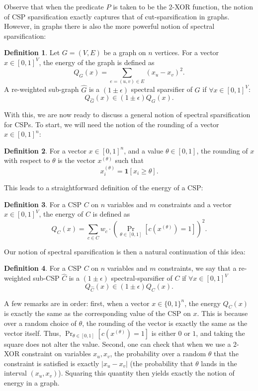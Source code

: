 \documentclass[11pt]{article}
\theoremstyle{definition}
\newtheorem{definition}{Definition}[section]
\newcommand{\zo}{\{0, 1\}}
\newcommand{\eps}{\epsilon}
\begin{document}
Observe that when the predicate $P$ is taken to be the 2-XOR function, the notion of CSP sparsification exactly captures that of cut-sparsification in graphs. However, in graphs there is also the more powerful notion of spectral sparsification:

\begin{definition}
    Let $G = (V, E)$ be a graph on $n$ vertices. For a vector $x \in [0,1]^V$, the energy of the graph is defined as
    \[
    Q_G(x) = \sum_{e = (u,v) \in E} (x_u - x_v)^2.
    \]
    A re-weighted sub-graph $\hat{G}$ is a $(1 \pm \eps)$ spectral sparsifier of $G$ if $\forall x \in [0,1]^V$:
    \[
    Q_{\hat{G}}(x) \in (1 \pm \eps)Q_{G}(x).
    \]
\end{definition}

With this, we are now ready to discuss a general notion of spectral sparsification for CSPs. To start, we will need the notion of the rounding of a vector $x \in [0,1]^n$:

\begin{definition}
    For a vector $x \in [0,1]^n$, and a value $\theta \in [0,1]$, the rounding of $x$ with respect to $\theta$ is the vector $x^{(\theta)}$ such that
    \[
    x^{(\theta)}_i = \mathbf{1}[x_i \geq \theta].
    \]
\end{definition}

This leads to a straightforward definition of the energy of a CSP:

\begin{definition}
    For a CSP $C$ on $n$ variables and $m$ constraints and a vector $x \in [0,1]^V$, the energy of $C$ is defined as 
    \[
    Q_C(x) = \sum_{c \in C} w_c \cdot \left(\Pr_{\theta \in [0,1]}[c(x^{(\theta)}) = 1] \right)^2.
    \]
\end{definition}

Our notion of spectral sparsification is then a natural continuation of this idea:

\begin{definition}
    For a CSP $C$ on $n$ variables and $m$ constraints, we say that a re-weighted sub-CSP $\hat{C}$ is a $(1 \pm \eps)$ spectral-sparsifier of $C$ if $\forall x \in [0,1]^V$
    \[
    Q_{\hat{C}}(x) \in (1 \pm \eps)Q_{C}(x).
    \]
\end{definition}

A few remarks are in order: first, when a vector $x \in \zo^n$, the energy $Q_C(x)$ is exactly the same as the corresponding value of the CSP on $x$. This is because over a random choice of $\theta$, the rounding of the vector is exactly the same as the vector itself. Thus, $\Pr_{\theta \in [0,1]}[c(x^{(\theta)}) = 1]$ is either $0$ or $1$, and taking the square does not alter the value. Second, one can check that when we use a $2$-XOR constraint on variables $x_u, x_v$, the probability over a random $\theta$ that the constraint is satisfied is exactly $|x_u - x_v|$ (the probability that $\theta$ lands in the interval $(x_u, x_v)$). Squaring this quantity then yields exactly the notion of energy in a graph. 
\end{document}
